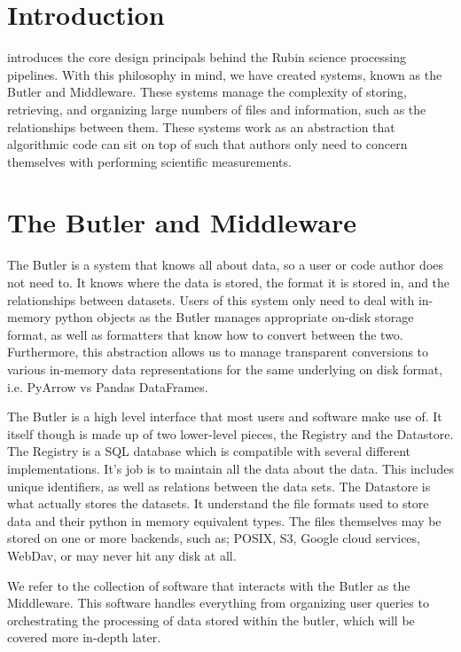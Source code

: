 \section{Introduction}

\citet{I08_adassxxxii} introduces the core design principals behind the Rubin science processing pipelines. With this philosophy in mind, we have created systems, known as the Butler and Middleware. These systems manage the complexity of storing, retrieving, and organizing large numbers of files and information, such as the relationships between them. These systems work as an abstraction that algorithmic code can sit on top of such that authors only need to concern themselves with performing scientific measurements.

\section{The Butler and Middleware}
The Butler is a system that knows all about data, so a user or code author does not need to. It knows where the data is stored, the format it is stored in, and the relationships between datasets. Users of this system only need to deal with in-memory python objects as the Butler manages appropriate on-disk storage format, as well as formatters that know how to convert between the two. Furthermore, this abstraction allows us to manage transparent conversions to various in-memory data representations for the same underlying on disk format, i.e. PyArrow vs Pandas DataFrames.

The Butler is a high level interface that most users and software make use of. It itself though is made up of two lower-level pieces, the Registry and the Datastore. The Registry is a SQL database which is compatible with several different implementations. It's job is to maintain all the data about the data. This includes unique identifiers, as well as relations between the data sets. The Datastore is what actually stores the datasets. It understand the file formats used to store data and their python in memory equivalent types. The files themselves may be stored on one or more backends, such as; POSIX, S3, Google cloud services, WebDav, or may never hit any disk at all.

We refer to the collection of software that interacts with the Butler as the Middleware. This software handles everything from organizing user queries to orchestrating the processing of data stored within the butler, which will be covered more in-depth later.

